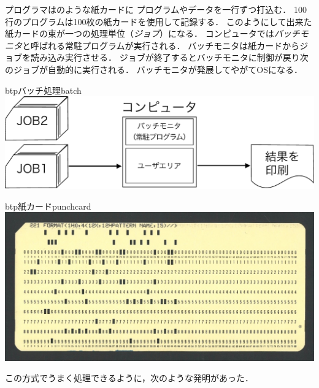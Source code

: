 プログラマはのような紙カードに
プログラムやデータを一行ずつ打込む．
100行のプログラムは100枚の紙カードを使用して記録する．
このようにして出来た紙カードの束が一つの処理単位（\emph{ジョブ}）になる．
コンピュータでは\emph{バッチモニタ}と呼ばれる常駐プログラムが実行される．
バッチモニタは紙カードからジョブを読み込み実行させる．
ジョブが終了するとバッチモニタに制御が戻り次のジョブが自動的に実行される．
バッチモニタが発展してやがてOSになる．

\begin{myfig}{btp}{バッチ処理}{batch}
  \includegraphics[scale=0.5]{Fig/batch-crop.pdf}
\end{myfig}

\begin{myfig}{btp}{紙カード}{punchcard}
  \includegraphics[scale=0.3]{Photo/punchcard.jpg}
\end{myfig}

この方式でうまく処理できるように，次のような発明があった．

